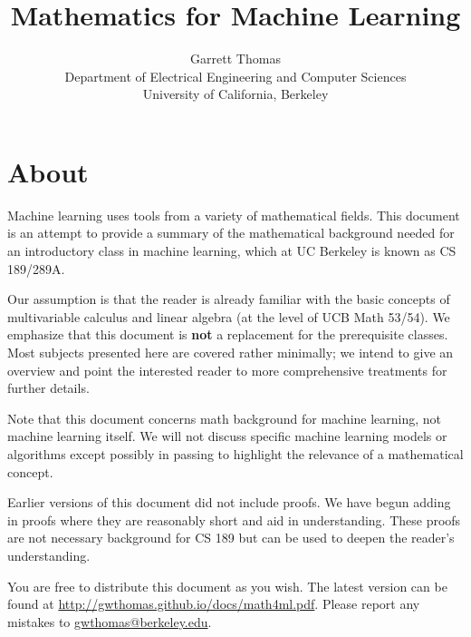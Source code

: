 \documentclass{article}
\title{Mathematics for Machine Learning}
\author{Garrett Thomas\\
Department of Electrical Engineering and Computer Sciences\\
University of California, Berkeley}
\begin{document}
\maketitle

\section{About}
Machine learning uses tools from a variety of mathematical fields.
This document is an attempt to provide a summary of the mathematical background needed for an introductory class in machine learning, which at UC Berkeley is known as CS 189/289A.

Our assumption is that the reader is already familiar with the basic concepts of multivariable calculus and linear algebra (at the level of UCB Math 53/54).
We emphasize that this document is \textbf{not} a replacement for the prerequisite classes.
Most subjects presented here are covered rather minimally; we intend to give an overview and point the interested reader to more comprehensive treatments for further details.

Note that this document concerns math background for machine learning, not machine learning itself.
We will not discuss specific machine learning models or algorithms except possibly in passing to highlight the relevance of a mathematical concept.

Earlier versions of this document did not include proofs.
We have begun adding in proofs where they are reasonably short and aid in understanding.
These proofs are not necessary background for CS 189 but can be used to deepen the reader's understanding.

You are free to distribute this document as you wish.
The latest version can be found at \url{http://gwthomas.github.io/docs/math4ml.pdf}.
Please report any mistakes to \url{gwthomas@berkeley.edu}.

\newpage
\tableofcontents

\newpage
\end{document}
